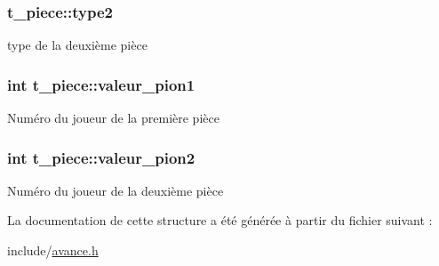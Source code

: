 \subsubsection[{\texorpdfstring{type2}{type2}}]{ t\+\_\+piece\+::type2}\hypertarget{structt__piece_ad48b124427fe8c945cee48b15f2a270b}{}\label{structt__piece_ad48b124427fe8c945cee48b15f2a270b}
type de la deuxième pièce 
\subsubsection[{\texorpdfstring{valeur\+\_\+pion1}{valeur_pion1}}]{\setlength{\rightskip}{0pt plus 5cm}int t\+\_\+piece\+::valeur\+\_\+pion1}\hypertarget{structt__piece_a2854e60853e81ec5cb32a0b4d42a2c8f}{}\label{structt__piece_a2854e60853e81ec5cb32a0b4d42a2c8f}
Numéro du joueur de la première pièce 
\subsubsection[{\texorpdfstring{valeur\+\_\+pion2}{valeur_pion2}}]{\setlength{\rightskip}{0pt plus 5cm}int t\+\_\+piece\+::valeur\+\_\+pion2}\hypertarget{structt__piece_a072647ef6ac729981f55d043655f928f}{}\label{structt__piece_a072647ef6ac729981f55d043655f928f}
Numéro du joueur de la deuxième pièce 

La documentation de cette structure a été générée à partir du fichier suivant \+:\begin{DoxyCompactItemize}
\item 
include/\hyperlink{avance_8h}{avance.\+h}\end{DoxyCompactItemize}
